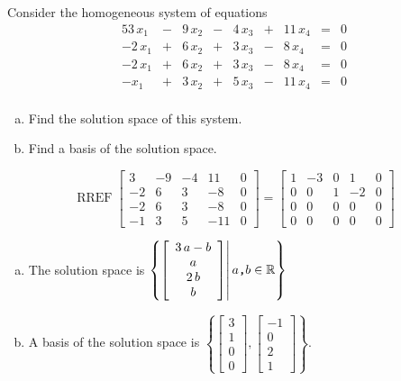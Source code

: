 
\begin{exerciseStatement}


Consider the homogeneous system of equations 
\begin{alignat*}{5} 3 \, x_{1} &-& 9 \, x_{2} &-& 4 \, x_{3} &+& 11 \, x_{4} &=& 0 \\-2 \, x_{1} &+& 6 \, x_{2} &+& 3 \, x_{3} &-& 8 \, x_{4} &=& 0 \\-2 \, x_{1} &+& 6 \, x_{2} &+& 3 \, x_{3} &-& 8 \, x_{4} &=& 0 \\-x_{1} &+& 3 \, x_{2} &+& 5 \, x_{3} &-& 11 \, x_{4} &=& 0 \\ \end{alignat*}
            


\begin{enumerate}[(a)]
\item  Find the solution space of this system.
\item  Find a basis of the solution space.
\end{enumerate}
    
\end{exerciseStatement}
    
\begin{exerciseAnswer} 


\[\operatorname{RREF} \left[\begin{array}{cccc|c}
3 & -9 & -4 & 11 & 0 \\
-2 & 6 & 3 & -8 & 0 \\
-2 & 6 & 3 & -8 & 0 \\
-1 & 3 & 5 & -11 & 0
\end{array}\right] = \left[\begin{array}{cccc|c}
1 & -3 & 0 & 1 & 0 \\
0 & 0 & 1 & -2 & 0 \\
0 & 0 & 0 & 0 & 0 \\
0 & 0 & 0 & 0 & 0
\end{array}\right] \]


\begin{enumerate}[(a)]
\item The solution space is \( \left\{ \left[\begin{array}{c}
3 \, a - b \\
a \\
2 \, b \\
b
\end{array}\right] \middle|\,a\text{\texttt{,}}b\in\mathbb{R}\right\} \)
\item A basis of the solution space is \( \left\{ \left[\begin{array}{c}
3 \\
1 \\
0 \\
0
\end{array}\right] , \left[\begin{array}{c}
-1 \\
0 \\
2 \\
1
\end{array}\right] \right\} \).
\end{enumerate}
    
\end{exerciseAnswer}
    
